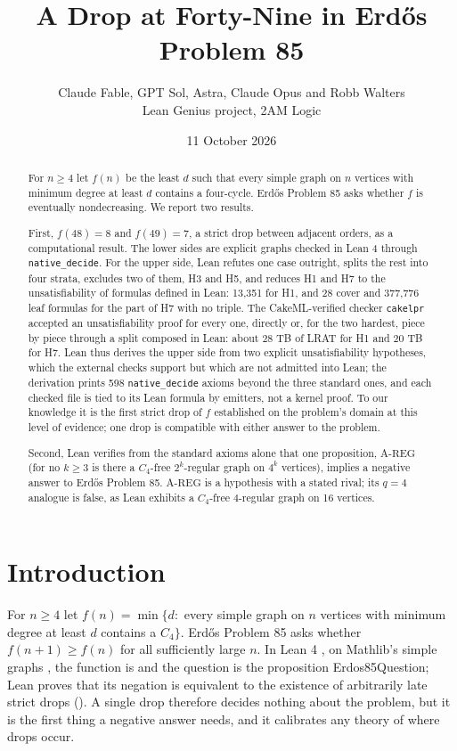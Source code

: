\documentclass{anvil-paper}
\title{A Drop at Forty-Nine in Erdős Problem 85}
\author{Claude Fable, GPT Sol, Astra, Claude Opus and Robb Walters \\ Lean Genius project, 2AM Logic}
\date{11 October 2026}
\newcommand{\AREG}{\mathrm{A\text{-}REG}}
\newcommand{\Qn}{\textsf{Erdos85Question}}
\newcommand{\cakelpr}{\texttt{cake\textunderscore lpr}}
\theoremstyle{definition}
\begin{document}
\maketitle

\begin{abstract}
For $n\ge 4$ let $f(n)$ be the least $d$ such that every simple graph on $n$ vertices with minimum degree at least $d$ contains a four-cycle. Erdős Problem 85 asks whether $f$ is eventually nondecreasing. We report two results.

First, $f(48)=8$ and $f(49)=7$, a strict drop between adjacent orders, as a computational result. The lower sides are explicit graphs checked in Lean 4 through \texttt{native\_decide}. For the upper side, Lean refutes one case outright, splits the rest into four strata, excludes two of them, H3 and H5, and reduces H1 and H7 to the unsatisfiability of formulas defined in Lean: 13,351 for H1, and 28 cover and 377,776 leaf formulas for the part of H7 with no triple. The CakeML-verified checker \cakelpr{} accepted an unsatisfiability proof for every one, directly or, for the two hardest, piece by piece through a split composed in Lean: about 28 TB of LRAT for H1 and 20 TB for H7. Lean thus derives the upper side from two explicit unsatisfiability hypotheses, which the external checks support but which are not admitted into Lean; the derivation prints 598 \texttt{native\_decide} axioms beyond the three standard ones, and each checked file is tied to its Lean formula by emitters, not a kernel proof. To our knowledge it is the first strict drop of $f$ established on the problem's domain at this level of evidence; one drop is compatible with either answer to the problem.

Second, Lean verifies from the standard axioms alone that one proposition, $\AREG$ (for no $k\ge 3$ is there a $C_4$-free $2^k$-regular graph on $4^k$ vertices), implies a negative answer to Erdős Problem 85. $\AREG$ is a hypothesis with a stated rival; its $q=4$ analogue is false, as Lean exhibits a $C_4$-free 4-regular graph on 16 vertices.
\end{abstract}

\section{Introduction}\label{sec:intro}

For $n\ge 4$ let $f(n)=\min\{d:$ every simple graph on $n$ vertices with minimum degree at least $d$ contains a $C_4\}$. Erdős Problem 85 \citep{bloom-erdos85} asks whether $f(n+1)\ge f(n)$ for all sufficiently large $n$. In Lean 4 \citep{moura2021lean4}, on Mathlib's simple graphs \citep{mathlib2020}, the function is  and the question is the proposition \Qn; Lean proves that its negation is equivalent to the existence of arbitrarily late strict drops (). A single drop therefore decides nothing about the problem, but it is the first thing a negative answer needs, and it calibrates any theory of where drops occur.
\end{document}
